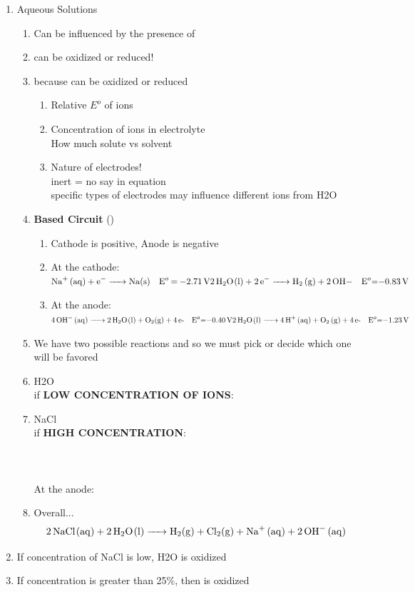 \documentclass{article}
\begin{document}
\begin{enumerate}
\item Aqueous Solutions
\begin{enumerate}
\item Can be influenced by the presence of 
\item {} can be oxidized or reduced!
\item because \textbf{} can be oxidized or reduced
\begin{enumerate}
\item Relative $E^{o}$ of ions
\item Concentration of ions in electrolyte\\How much solute vs solvent
\item Nature of electrodes!\\inert = no say in equation\\specific types of electrodes may influence different ions from H2O
\end{enumerate}
\item \textbf{ Based Circuit} ()
\begin{enumerate}
\item Cathode is positive, Anode is negative
\item At the cathode: $\ce{Na+ (aq) + e- -> Na(s)\ \ \ E^{o} = -2.71V}\\\ce{2H2O(l) + 2e- -> H2 (g) + 2OH-\ \ \ E^{o}=-0.83V}$
\item At the anode: $\ce{4OH- (aq) -> 2H2O(l) + O2(g) + 4e-\ \ \ E^{o}=-0.40V}\\\ce{2H2O(l) -> 4H+ (aq) + O2 (g) + 4e-\ \ \ E^{o}=-1.23V}$
\end{enumerate}
\item We have two possible reactions and so we must pick or decide which one will be favored
\item H2O\\if \textbf{LOW CONCENTRATION OF IONS}:\\ 
\item NaCl\\if \textbf{HIGH CONCENTRATION}:\\\\\\\\At the anode:
\\

\item Overall...\\$$\ce{2NaCl(aq) + 2H2O(l) -> H2(g) + Cl2(g) + Na+ (aq) + 2OH- (aq)}$$
\end{enumerate}
\item If concentration of NaCl is low, H2O is oxidized
\item If concentration is greater than 25\%, then  is oxidized
\end{enumerate}
\end{document}
